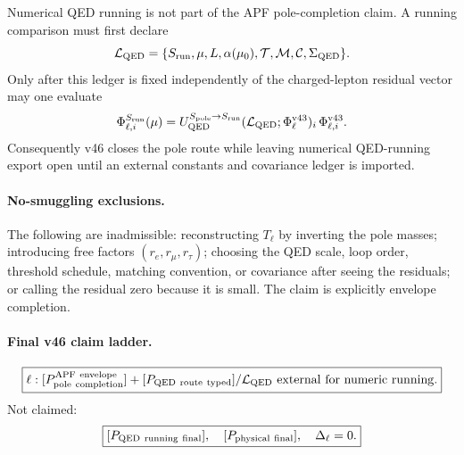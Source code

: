 \begin{{corollary}}[QED running is downstream external-ledger transport]
Numerical QED running is not part of the APF pole-completion claim.  A running comparison must first declare
\[
\mathcal L_{{\rm QED}}
=\{S_{{\rm run}},\mu,L,\alpha(\mu_0),\mathcal T,\mathcal M,\mathcal C,\Sigma_{{\rm QED}}\}.
\]
Only after this ledger is fixed independently of the charged-lepton residual vector may one evaluate
\[
\Phi_{{\ell},i}^{{S_{{\rm run}}}}(\mu)
=
U_{{\rm QED}}^{{S_{{\rm pole}}\to S_{{\rm run}}}}
(\mathcal L_{{\rm QED}};\Phi_\ell^{{\rm v43}})_i\,
\Phi_{{\ell},i}^{{\rm v43}}.
\]
Consequently v46 closes the pole route while leaving numerical QED-running export open until an external constants and covariance ledger is imported.
\end{{corollary}}

\paragraph{{No-smuggling exclusions.}}
The following are inadmissible: reconstructing \(T_\ell\) by inverting the pole masses; introducing free factors \((r_e,r_\mu,r_\tau)\); choosing the QED scale, loop order, threshold schedule, matching convention, or covariance after seeing the residuals; or calling the residual zero because it is small.  The claim is explicitly envelope completion.

\paragraph{{Final v46 claim ladder.}}
\[
\boxed{{
\ell:
[P_{{\rm pole\ completion}}^{{\rm APF\ envelope}}]
+
[P_{{\rm QED\ route\ typed}}]
/
\mathcal L_{{\rm QED}}\ {\rm external\ for\ numeric\ running}.
}}
\]
Not claimed:
\[
\boxed{{
[P_{{\rm QED\ running\ final}}],\quad
[P_{{\rm physical\ final}}],\quad
\Delta_\ell=0.
}}
\]
